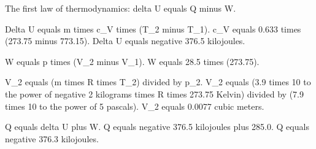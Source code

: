 The first law of thermodynamics: delta U equals Q minus W.  

Delta U equals m times c_V times (T_2 minus T_1).  
c_V equals 0.633 times (273.75 minus 773.15).  
Delta U equals negative 376.5 kilojoules.  

W equals p times (V_2 minus V_1).  
W equals 28.5 times (273.75).  

V_2 equals (m times R times T_2) divided by p_2.  
V_2 equals (3.9 times 10 to the power of negative 2 kilograms times R times 273.75 Kelvin) divided by (7.9 times 10 to the power of 5 pascals).  
V_2 equals 0.0077 cubic meters.  

Q equals delta U plus W.  
Q equals negative 376.5 kilojoules plus 285.0.  
Q equals negative 376.3 kilojoules.
